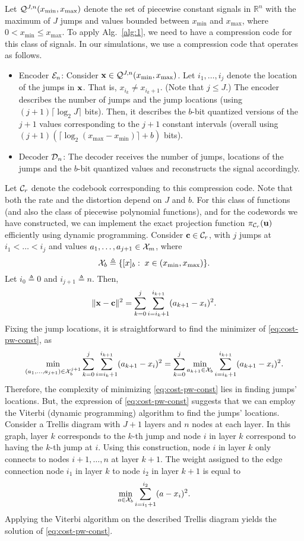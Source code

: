 \documentclass[onecolumn]{IEEEtran}
\newcommand{\cv}{{\bf c}}
\begin{document}
 Let $\mathcal{Q}^{J,n}(x_{\min},x_{\max})$ denote the set of piecewise constant signals  in $\mathds{R}^n$ with the maximum of $J$ jumps and values bounded between $x_{\min}$ and $x_{\max}$, where $0<x_{\min} \leq x_{\max}$. To apply Alg.~\ref{alg:1}, we need to have a compression code for this class of signals.  In our simulations, we use a compression code that operates as follows.
\begin{itemize}
\item Encoder $\mathcal{E}_n$: Consider ${\bf x}\in \mathcal{Q}^{J,n}(x_{\min},x_{\max})$. Let $i_1,\ldots,i_j$ denote the location of the jumps in ${\bf x}$. That is, $x_{i_k}\neq x_{i_k+1}$. (Note that $j\leq J$.) The encoder describes the number of jumps and the jump locations (using $(j+1)\lceil \log_2 J\rceil$ bits). Then, it describes the $b$-bit quantized versions of the  $j+1$ values  corresponding  to  the $j+1$ constant intervals (overall using $(j+1)(\lceil \log_2 ( x_{\max}-x_{\min}) \rceil +b)$ bits).   
\item Decoder $\mathcal{D}_n$: The decoder receives the number of jumps, locations of the jumps and the $b$-bit quantized values and reconstructs the signal accordingly. 
\end{itemize}
Let $\mathcal{C}_r$ denote the codebook corresponding to this compression code. Note that both the rate and the distortion depend on $J$ and $b$. For this class of functions (and also the class of piecewise polynomial functions), and for the codewords we have constructed, we can implement the exact projection function $ \pi_{\mathcal{C}_r}({\bf u})$ efficiently using dynamic programming. 
Consider $\cv\in\Cc_r$, with $j$ jumps at $i_1<\ldots<i_j$ and values $a_1,\ldots,a_{j+1}\in\mathcal{X}_m$, where
\[
\mathcal{X}_b\triangleq \{[x]_b:\; x\in(x_{\min},x_{\max})\}.
\]
Let $i_0\triangleq 0$ and $i_{j+1}\triangleq n$. Then,
\begin{align}
\|\xv-\cv\|^2=\sum_{k=0}^{j}\sum_{i=i_k+1}^{i_{k+1}}(a_{k+1}-x_i)^2.\label{eq:cost-pw-const}
\end{align}
Fixing the jump locations, it is straightforward to find the minimizer of \eqref{eq:cost-pw-const}, as  
\[
\min_{(a_1,\ldots,a_{j+1})\in\mathcal{X}_b^{j+1}}\sum_{k=0}^{j}\sum_{i=i_k+1}^{i_{k+1}}(a_{k+1}-x_i)^2=\sum_{k=0}^{j}\min_{a_{k+1}\in\mathcal{X}_b}\sum_{i=i_k+1}^{i_{k+1}}(a_{k+1}-x_i)^2. 
\]
Therefore, the complexity of minimizing \eqref{eq:cost-pw-const} lies in finding jumps' locations. But, the expression of \eqref{eq:cost-pw-const} suggests that we can employ the Viterbi (dynamic programming) algorithm \cite{Viterbi:67} to find the  jumps' locations.  Consider a Trellis diagram with $J+1$ layers and $n$ nodes at each layer.  In this graph, layer $k$ corresponds to the $k$-th jump and node $i$ in layer $k$ correspond to having the $k$-th jump at $i$. Using this construction, node $i$ in layer $k$ only connects to nodes $i+1,\ldots,n$ at layer $k+1$. The weight assigned to the edge connection node $i_1$ in layer $k$ to node $i_2$ in layer $k+1$ is equal to 
\[
\min_{a\in\mathcal{X}_b} \sum_{i=i_1+1}^{i_2}(a-x_i)^2.
\]
Applying the Viterbi algorithm on the described Trellis diagram yields the solution of \eqref{eq:cost-pw-const}. 
\end{document}
